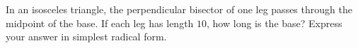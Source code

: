In an isosceles triangle, the perpendicular bisector of one leg passes through the midpoint of the base. If each leg has length $10$, how long is the base? Express your answer in simplest radical form.
